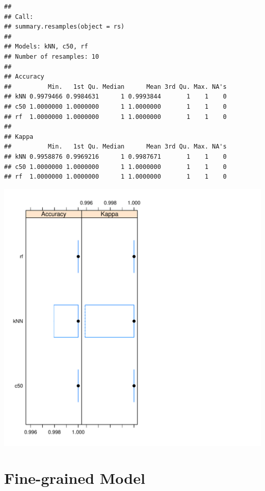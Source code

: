 \documentclass[10pt  ,usenames, dvipsnames]{article}\usepackage[]{graphicx}\usepackage[]{color}
\makeatletter
\def\maxwidth{ %
  \ifdim\Gin@nat@width>\linewidth
    \linewidth
  \else
    \Gin@nat@width
  \fi
}
\newenvironment{kframe}{%
 \def\at@end@of@kframe{}%
 \ifinner\ifhmode%
  \def\at@end@of@kframe{\end{minipage}}%
  \begin{minipage}{\columnwidth}%
 \fi\fi%
 \def\FrameCommand##1{\hskip\@totalleftmargin \hskip-\fboxsep
 \colorbox{shadecolor}{##1}\hskip-\fboxsep
     \hskip-\linewidth \hskip-\@totalleftmargin \hskip\columnwidth}%
 \MakeFramed {\advance\hsize-\width
   \@totalleftmargin\z@ \linewidth\hsize
   \@setminipage}}%
 {\par\unskip\endMakeFramed%
 \at@end@of@kframe}
\newenvironment{knitrout}{}{} %
\makeatother
\begin{document}
\begin{knitrout}
\color{fgcolor}\begin{kframe}
\begin{verbatim}
## 
## Call:
## summary.resamples(object = rs)
## 
## Models: kNN, c50, rf 
## Number of resamples: 10 
## 
## Accuracy 
##          Min.   1st Qu. Median      Mean 3rd Qu. Max. NA's
## kNN 0.9979466 0.9984631      1 0.9993844       1    1    0
## c50 1.0000000 1.0000000      1 1.0000000       1    1    0
## rf  1.0000000 1.0000000      1 1.0000000       1    1    0
## 
## Kappa 
##          Min.   1st Qu. Median      Mean 3rd Qu. Max. NA's
## kNN 0.9958876 0.9969216      1 0.9987671       1    1    0
## c50 1.0000000 1.0000000      1 1.0000000       1    1    0
## rf  1.0000000 1.0000000      1 1.0000000       1    1    0
\end{verbatim}
\end{kframe}
\includegraphics[width=\maxwidth]{figure/unnamed-chunk-48-1} 

\end{knitrout}


\clearpage



\section{Fine-grained Model}
\end{document}
